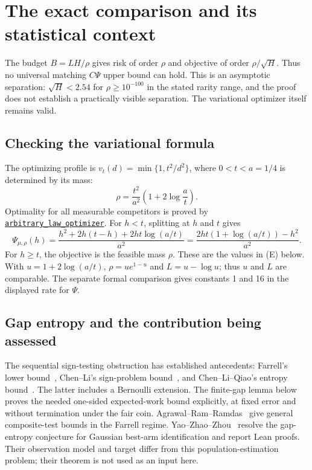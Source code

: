 \section*{The exact comparison and its statistical context}

The budget $B=LH/\rho$ gives risk of order $\rho$ and objective of order
$\rho/\sqrt H$. Thus no universal matching $C\Psi$ upper bound can hold.
This is an asymptotic separation: $\sqrt H<2.54$ for
$\rho\ge10^{-100}$ in the stated rarity range, and the proof does not
establish a practically visible separation. The variational optimizer
itself remains valid.

\subsection*{Checking the variational formula}
The optimizing profile is $v_t(d)=\min\{1,t^2/d^2\}$, where $0<t<a=1/4$
is determined by its mass:
\[
 \rho=\frac{t^2}{a^2}\left(1+2\log\frac at\right).
\]
Optimality for all measurable competitors is proved by
\href{https://github.com/davidiach/adaptive-threshold-estimation/blob/eabf274cb42d4bff4daab6b58568ad6169e7f0a7/lean/ThresholdHC/Tier3/Optimizer.lean}{\texttt{arbitrary\_law\_optimizer}}.
For $h<t$, splitting at $h$ and $t$ gives
\[
 \Psi_{\mu,\rho}(h)=\frac{h^2+2h(t-h)+2ht\log(a/t)}{a^2}
 =\frac{2ht(1+\log(a/t))-h^2}{a^2}.
\]
For $h\ge t$, the objective is the feasible mass $\rho$.
These are the values in (E) below. With $u=1+2\log(a/t)$,
$\rho=ue^{1-u}$ and $L=u-\log u$; thus $u$ and $L$ are comparable.
The separate formal comparison gives constants 1 and 16 in the displayed
rate for $\Psi$.

\subsection*{Gap entropy and the contribution being assessed}
The sequential sign-testing obstruction has established antecedents:
Farrell's lower bound~\cite{farrell}, Chen--Li's sign-problem
bound~\cite{chenli}, and Chen--Li--Qiao's entropy bound~\cite[Lemma 4.1 and
Remark D.4]{clq}. The latter includes a Bernoulli extension. The finite-gap
lemma below proves the needed one-sided expected-work bound explicitly,
at fixed error and without termination under the fair coin.
Agrawal--Ram--Ramdas~\cite{agrawal} give general composite-test bounds in
the Farrell regime. Yao--Zhao--Zhou~\cite{yao} resolve the gap-entropy
conjecture for Gaussian best-arm identification and report Lean proofs.
Their observation model and target differ from this population-estimation
problem; their theorem is not used as an input here.

